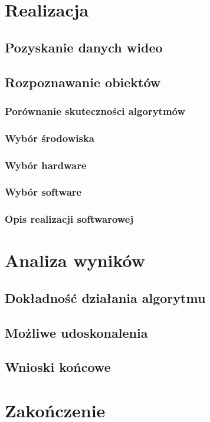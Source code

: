\documentclass[openright]{xmgr}
\begin{document}
\chapter{Realizacja} \label{ch:realizacja}
\subsection*{} \noindent 
\section{Pozyskanie danych wideo}
\section{Rozpoznawanie obiektów}
\subsection{Porównanie skuteczności algorytmów}
\subsection{Wybór środowiska}
\subsection{Wybór hardware}
\subsection{Wybór software}
\subsection{Opis realizacji softwarowej}
\chapter{Analiza wyników} \label{ch:analizawynikow}
\section{Dokładność działania algorytmu}
\section{Możliwe udoskonalenia}
\section{Wnioski końcowe}
\chapter{Zakończenie} \label{ch:zakonczenie}
\end{document}
